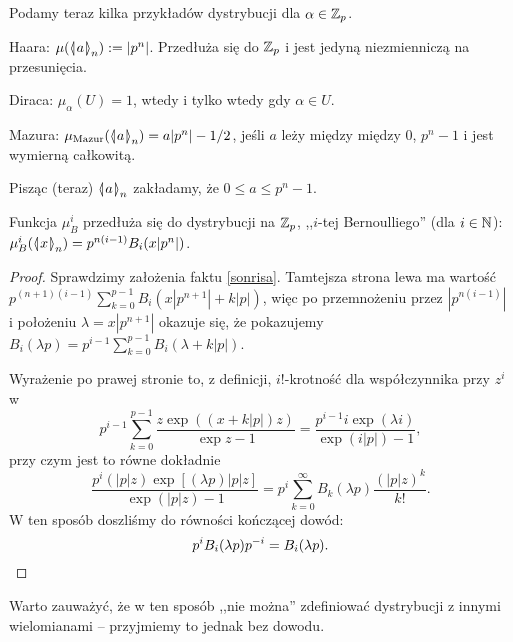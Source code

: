 Podamy teraz kilka przykładów dystrybucji dla $\alpha \in \mathbb Z_p$.
\begin{enumx}
	\item {Haara}: $\mu(\mathrel{\langle\mkern-3.85mu\mid\mkern-4mu} {a}\mathrel{\mkern-4mu\mid\mkern-3.85mu\rangle}_{n}) := |p^n|$.
	Przedłuża się do $\mathbb Z_p$ i jest jedyną niezmienniczą na przesunięcia.
	\item {Diraca}: $\mu_\alpha(U) = 1$, wtedy i tylko wtedy gdy $\alpha \in U$.
	\item {Mazura}: $\mu_{\textrm{Mazur}}(\mathrel{\langle\mkern-3.85mu\mid\mkern-4mu} {a}\mathrel{\mkern-4mu\mid\mkern-3.85mu\rangle}_{n}) = a|p^n| - 1/2$, jeśli $a$ leży między między $0$, $p^n - 1$ i jest wymierną całkowitą.
\end{enumx}

Pisząc (teraz) $\mathrel{\langle\mkern-3.85mu\mid\mkern-4mu} {a}\mathrel{\mkern-4mu\mid\mkern-3.85mu\rangle}_{n}$ zakładamy, że $0 \le a \le p^n - 1$.

\begin{fakt}
	Funkcja $\mu_{B}^i$ przedłuża się do dystrybucji na $\mathbb Z_p$, ,,$i$-tej  Bernoulliego'' (dla $i \in \mathbb N$): $\mu_{B}^i (\mathrel{\langle\mkern-3.85mu\mid\mkern-4mu} {x}\mathrel{\mkern-4mu\mid\mkern-3.85mu\rangle}_{n}) = p^{n(i-1)} B_i (x |p^n|)$.
\end{fakt}

\begin{proof}
	Sprawdzimy założenia faktu \ref{sonrisa}.
	Tamtejsza  strona lewa ma wartość $p^{(n+1)(i-1)} \sum_{k=0}^{p-1} B_i(x|p^{n+1}| + k|p|)$,
	więc po przemnożeniu przez $|p^{n(i-1)}|$ i położeniu $\lambda = x|p^{n+1}|$ okazuje się, że pokazujemy 
	$B_i(\lambda p) = p^{i-1} \sum_{k=0}^{p-1} B_i(\lambda + k|p|)$.
	
	Wyrażenie po prawej stronie to, z definicji, $i!$-krotność dla współczynnika przy $z^i$ w
	\[
		p^{i-1} \sum_{k = 0}^{p-1} \frac{z\exp((x + k|p|)z)}{\exp z - 1} = \frac{p^{i-1}i\exp (\lambda i)}{\exp (i|p|) - 1},
	\]
	przy czym jest to równe dokładnie
	\[
		\frac{p^i(|p|z)\exp[(\lambda p) |p| z]}{\exp(|p|z) - 1} = p^i \sum_{k=0}^\infty B_k(\lambda p) \frac{(|p| z)^k}{k!}.
	\]
	W ten sposób doszliśmy do równości kończącej dowód:
	\[
		p^iB_i(\lambda p)p^{-i} = B_i(\lambda p). \qedhere
	\]
\end{proof}

Warto zauważyć, że w ten sposób ,,nie można'' zdefiniować dystrybucji z innymi wielomianami -- przyjmiemy to jednak bez dowodu.
